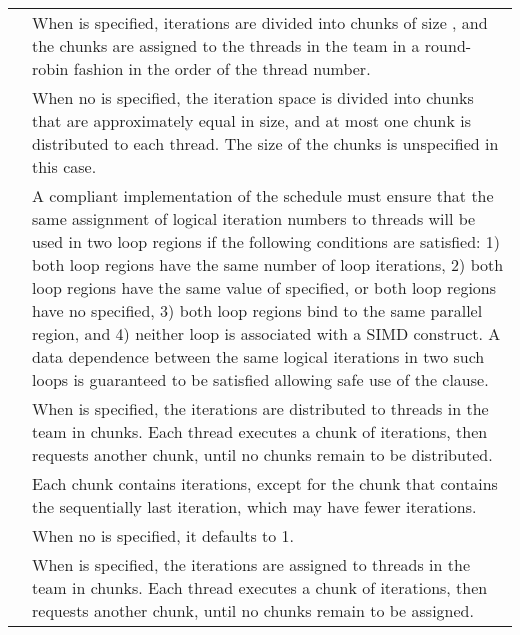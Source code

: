 \begin{supertabular}{ p{0.8in} p{4.3in} }
 & When  is specified, iterations are divided 
into chunks of size , and the chunks are assigned to the threads in 
the team in a round-robin fashion in the order of the thread number.\\

 & When no  is specified, the iteration space is divided into chunks that 
are approximately equal in size, and at most one chunk is distributed to each 
thread. The size of the chunks is unspecified in this case.\\

 & A compliant implementation of the  schedule must ensure that the 
same assignment of logical iteration numbers to threads will be used in two 
loop regions if the following conditions are satisfied: 1) both loop regions have 
the same number of loop iterations, 2) both loop regions have the same value 
of  specified, or both loop regions have no  specified, 3) 
both loop regions bind to the same parallel region, and 4) neither loop is 
associated with a SIMD construct. A data dependence between the same 
logical iterations in two such loops is guaranteed to be satisfied allowing safe 
use of the  clause.\\

 & When  is specified, the iterations are
distributed to threads in the team in chunks. Each 
thread executes a chunk of iterations, then requests another chunk, until no 
chunks remain to be distributed. \\

 & Each chunk contains  iterations, except for the
chunk that contains the sequentially last iteration, which may have fewer iterations.\\

 & When no  is specified, it defaults to 1.\\

 & When  is specified, the iterations are
assigned to threads in the team in chunks. Each thread executes a
chunk of iterations, then requests another chunk, until no chunks remain to be assigned.\\


\end{supertabular}
